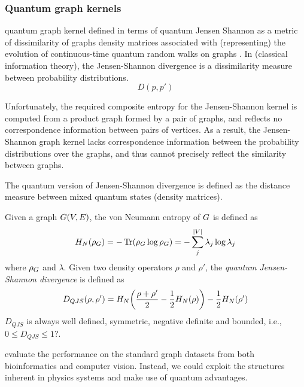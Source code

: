 \subsubsection{Quantum graph kernels}
quantum graph kernel defined in terms of quantum Jensen Shannon as a metric of dissimilarity of graphs
density matrices associated with (representing) the evolution of continuous-time quantum random walks on graphs
\cite{baiQuantumJensenShannon2015}.
In (classical information theory), the Jensen-Shannon divergence is a dissimilarity measure between probability distributions.
\begin{equation}
	D(p,p')
\end{equation}
\cite{baiQuantumKernelsUnattributed2017}
\begin{remark}
	Unfortunately, the required composite entropy for the Jensen-Shannon kernel is computed from a product graph formed by a pair of graphs,
	and reflects no correspondence information between pairs of vertices.
	As a result, the Jensen-Shannon graph kernel lacks correspondence information between the probability distributions over the graphs,
	and thus cannot precisely reflect the similarity between graphs.
\end{remark}
The quantum version of Jensen-Shannon divergence is defined as the distance measure between mixed quantum states (density matrices).
\begin{definition}[]
	Given a graph $G(V,E)$, the von Neumann entropy of $G$ is defined as
	\begin{equation}
		H_N (\rho_{G}) = -\Tr(\rho_{G}\log \rho_{G})
		= - \sum_{j}^{\abs{V}} \lambda_j \log \lambda_j
	\end{equation}
	where $\rho_{G}$ and $\lambda$.
	Given two density operators $\rho$ and $\rho'$,
	the \emph{quantum Jensen-Shannon divergence} is defined as
	\begin{equation}
		D_{QJS} (\rho,\rho') = 
		H_N\qty(\frac{\rho+\rho'}{2}- \frac{1}{2}H_N(\rho)) - \frac{1}{2} H_N (\rho')
	\end{equation}
	$D_{QJS}$ is always well defined, symmetric, negative definite and bounded, i.e., $0\le D_{QJS}\le 1$?.
\end{definition}
evaluate the performance on the standard graph datasets from both bioinformatics and computer vision.
Instead, we could exploit the structures inherent in physics systems and make use of quantum advantages.

